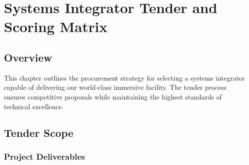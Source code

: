 \chapter{Systems Integrator Tender and Scoring Matrix}

\section{Overview}

This chapter outlines the procurement strategy for selecting a systems integrator capable of delivering our world-class immersive facility. The tender process ensures competitive proposals while maintaining the highest standards of technical excellence.

\section{Tender Scope}

\subsection{Project Deliverables}

